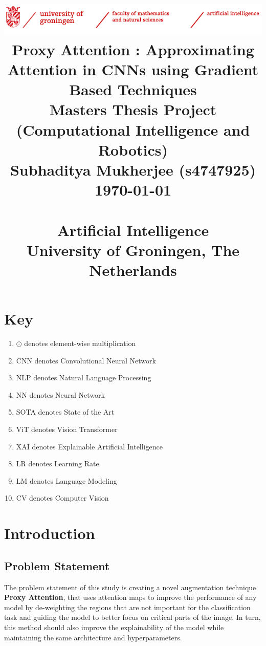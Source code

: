 \documentclass[a4paper,11pt,openright]{book}
\title{
    \centering\includegraphics[width=\textwidth]{images/banner.png}
    \vspace{5mm}
        {\bf
        {\Huge Proxy Attention : Approximating Attention in CNNs using Gradient Based Techniques\\
        }
        }
        \vspace{4mm}Masters Thesis Project\\(Computational Intelligence and Robotics)\\
        \vspace{4mm}Subhaditya Mukherjee (s4747925)\\ \today \\
        \vspace{5cm}{\LARGE Internal Supervisor: S.H. Mohades Kasaei, PhD\\ Second Internal Supervisor: Matias Valdenegro, PhD}\\
        {\bf {Artificial Intelligence\\University of Groningen, The Netherlands}}
}
\date{}
\begin{document}
\maketitle


\tableofcontents

\listoffigures


\chapter*{Key}

\begin{enumerate}
    \item $\odot$ denotes element-wise multiplication
    \item CNN denotes Convolutional Neural Network
    \item NLP denotes Natural Language Processing
    \item NN denotes Neural Network
    \item SOTA denotes State of the Art
    \item ViT denotes Vision Transformer
    \item XAI denotes Explainable Artificial Intelligence
    \item LR denotes Learning Rate
    \item LM denotes Language Modeling
    \item CV denotes Computer Vision
\end{enumerate}

\chapter{Introduction}

\section{Problem Statement}
The problem statement of this study is creating a novel augmentation technique \textbf{Proxy Attention}, that uses attention maps to improve the performance of any model by de-weighting the regions that are not important for the classification task and guiding the model to better focus on critical parts of the image.
In turn, this method should also improve the explainability of the model while maintaining the same architecture and hyperparameters.
\end{document}
